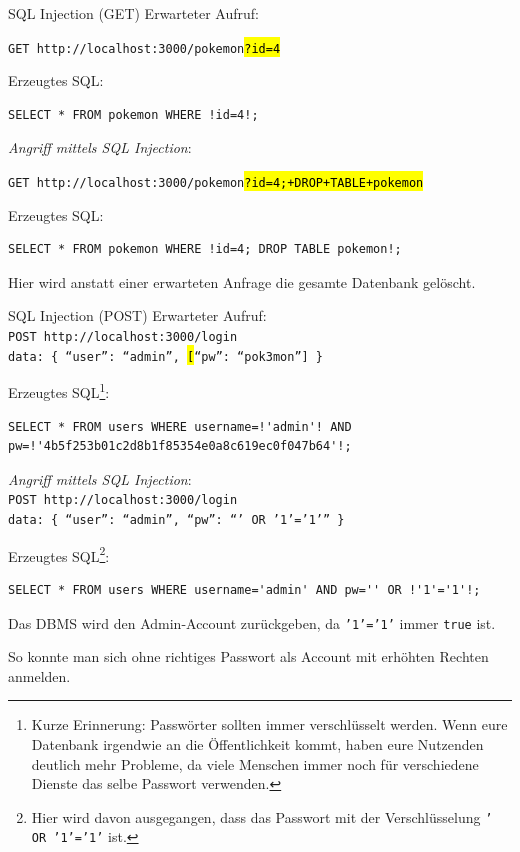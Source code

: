 \begin{example}{SQL Injection (GET)}
    Erwarteter Aufruf:

    \texttt{GET http://localhost:3000/pokemon\hl{?id=4}}

    Erzeugtes SQL:
    \begin{lstlisting}[language=mysql]
        SELECT * FROM pokemon WHERE !id=4!;
    \end{lstlisting}

    \emph{Angriff mittels SQL Injection}:

    \texttt{GET http://localhost:3000/pokemon\hl{?id=4;+DROP+TABLE+pokemon}}

    Erzeugtes SQL:
    \begin{lstlisting}[language=mysql]
        SELECT * FROM pokemon WHERE !id=4; DROP TABLE pokemon!;
    \end{lstlisting}

    Hier wird anstatt einer erwarteten Anfrage die gesamte Datenbank gelöscht.
\end{example}

\begin{example}{SQL Injection (POST)}
    Erwarteter Aufruf: \\
    \texttt{POST http://localhost:3000/login} \\
    \texttt{data: \{ \enquote{user}: \enquote{admin}, \hl[\enquote{pw}: \enquote{pok3mon}] \}}

    Erzeugtes SQL\footnote{
        Kurze Erinnerung: Passwörter sollten immer verschlüsselt werden.
        Wenn eure Datenbank irgendwie an die Öffentlichkeit kommt, haben eure Nutzenden deutlich mehr Probleme, da viele Menschen immer noch für verschiedene Dienste das selbe Passwort verwenden.
    }:
    \begin{lstlisting}[language=mysql]
        SELECT * FROM users WHERE username=!'admin'! AND pw=!'4b5f253b01c2d8b1f85354e0a8c619ec0f047b64'!;
    \end{lstlisting}

    \emph{Angriff mittels SQL Injection}: \\
    \texttt{POST http://localhost:3000/login} \\
    \texttt{data: \{ \enquote{user}: \enquote{admin}, \enquote{pw}: \enquote{' OR '1'='1'} \}}

    Erzeugtes SQL\footnote{Hier wird davon ausgegangen, dass das Passwort mit der Verschlüsselung \texttt{' OR '1'='1'} ist.}:
    \begin{lstlisting}[language=mysql]
        SELECT * FROM users WHERE username='admin' AND pw='' OR !'1'='1'!;
    \end{lstlisting}

    Das DBMS wird den Admin-Account zurückgeben, da \texttt{'1'='1'} immer \texttt{true} ist.

    So konnte man sich ohne richtiges Passwort als Account mit erhöhten Rechten anmelden.
\end{example}

